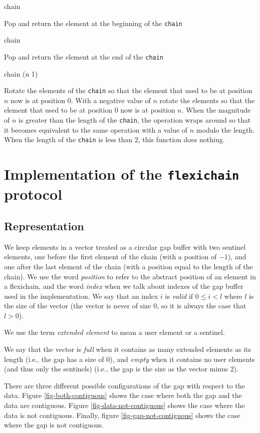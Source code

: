 \documentclass[11pt]{article}
\begin{document}
 {chain}

Pop and return the element at the beginning of the \texttt{chain}

 {chain}

Pop and return the element at the end of the \texttt{chain}

 {chain \optional (n 1)}

Rotate the elements of the \texttt{chain} so that the element that used
to be at position $n$ now is at position $0$.  With a negative value
of $n$ rotate the elements so that the element that used to be at
position $0$ now is at position $n$.  When the magnitude of $n$ is
greater than the length of the \texttt{chain}, the operation wraps
around so that it becomes equivalent to the same operation with a
value of $n$ modulo the length.  When the length of the \texttt{chain}
is less than $2$, this function does nothing. 

\section{Implementation of the \texttt{flexichain} protocol}

\subsection{Representation}

We keep elements in a vector treated as a circular gap buffer with two
sentinel elements, one before the first element of the chain (with a
position of $-1$), and one after the last element of the chain (with a
position equal to the length of the chain).  We use the word
\textit{position} to refer to the abstract position of an element in a
flexichain, and the word \textit{index} when we talk about indexes of
the gap buffer used in the implementation.  We say that an index $i$
is \emph{valid} if $0 \le i < l$ where $l$ is the size of the vector
(the vector is never of size $0$, so it is always the case that $l >
0$).

We use the term \emph{extended element} to mean a user element or a
sentinel. 

We say that the vector is \textit{full} when it contains as many
extended elements as its length (i.e., the gap has a size of $0$), and
\textit{empty} when it contains no user elements (and thus only the
sentinels) (i.e., the gap is the size as the vector minus
2).

There are three different possible configurations of the gap with
respect to the data.  Figure \ref{fig-both-contiguous} shows the case
where both the gap and the data are contiguous.  Figure
\ref{fig-data-not-contiguous} shows the case where the data is not
contiguous.  Finally, figure \ref{fig-gap-not-contiguous} shows the
case where the gap is not contiguous. 
\end{document}
